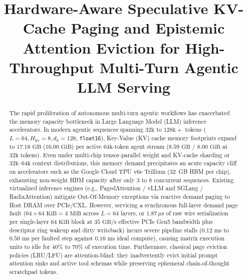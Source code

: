 \documentclass[conference,10pt]{IEEEtran}
\begin{document}
\title{Hardware-Aware Speculative KV-Cache Paging and Epistemic Attention Eviction for High-Throughput Multi-Turn Agentic LLM Serving}

\author{
}

\maketitle

\begin{abstract}
The rapid proliferation of autonomous multi-turn agentic workflows has exacerbated the memory capacity bottleneck in Large Language Model (LLM) inference accelerators. In modern agentic sequences spanning $32\text{k}$ to $128\text{k}+$ tokens ($L=64, H_{\text{kv}}=8, d_k=128$, \texttt{float16}), Key-Value (KV) cache memory footprints expand to $17.18\text{ GB}$ ($16.00\text{ GiB}$) per active $64\text{k}$-token agent stream ($8.59\text{ GB}$ / $8.00\text{ GiB}$ at $32\text{k}$ tokens). Even under multi-chip tensor-parallel weight and KV-cache sharding or $32\text{k}\text{--}64\text{k}$ context distributions, this memory demand precipitates an acute capacity cliff on accelerators such as the Google Cloud TPU v6e Trillium (32~GB HBM per chip), exhausting non-weight HBM capacity after only 3 to 8 concurrent sequences. Existing virtualized inference engines (e.g., PagedAttention / vLLM and SGLang / RadixAttention) mitigate Out-Of-Memory exceptions via reactive demand paging to Host DRAM over PCIe/CXL. However, servicing a synchronous full-layer demand page fault ($64 \times 64\text{ KiB} = 4\text{ MiB}$ across $L=64$ layers, or $1.87\,\mu\text{s}$ of raw wire serialization per single-layer $64\text{ KiB}$ block at $35\text{ GB/s}$ effective PCIe Gen5 bandwidth plus descriptor ring wakeup and dirty writeback) incurs severe pipeline stalls ($0.12\text{ ms}$ to $0.50\text{ ms}$ per faulted step against $0.16\text{ ms}$ ideal compute), causing matrix execution units to idle for 40\% to 70\% of execution time. Furthermore, classical page eviction policies (LRU/LFU) are attention-blind: they inadvertently evict initial prompt attention sinks and active tool schemas while preserving ephemeral chain-of-thought scratchpad tokens.


\end{abstract}
\end{document}
